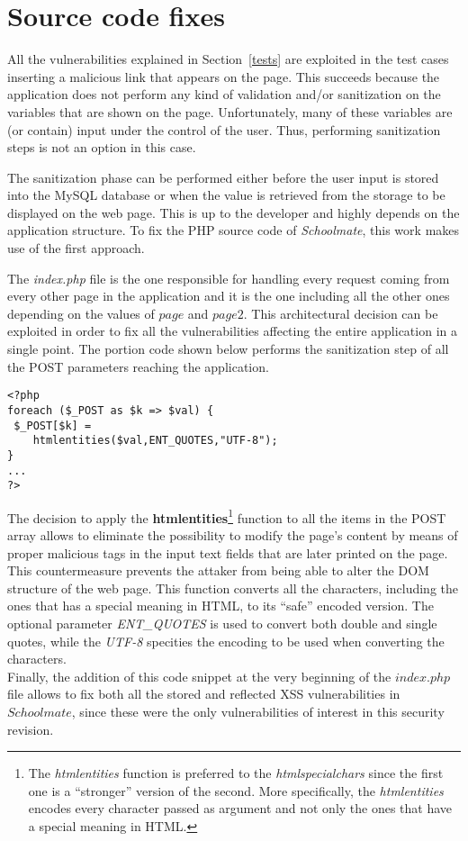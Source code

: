 \documentclass{sig-alternate-05-2015}
\begin{document}
\section{Source code fixes}\label{fixes}
All the vulnerabilities explained in Section~\ref{tests} are exploited in the test cases
inserting a malicious link that appears on the page. This succeeds because
the application does not perform any kind of validation and/or sanitization on the variables
that are shown on the page. Unfortunately, many of these variables are (or contain) input
under the control of the user. Thus, performing sanitization steps is not an option in this
case.

The sanitization phase can be performed either before the user input is stored into the
MySQL database or when the value is retrieved from the storage to be displayed on the
web page. This is up to the developer and highly depends on the application structure.
To fix the PHP source code of \emph{Schoolmate}, this work makes use of the first approach.

The \emph{index.php} file is the one responsible for handling every request coming from
every other page in the application and it is the one including all the other ones depending
on the values of $page$ and $page2$.
This architectural decision can be exploited in order
to fix all the vulnerabilities affecting the entire application in a single point.
The portion code shown below performs the sanitization step
of all the POST parameters reaching the application.

\begin{lstlisting}[frame=single, caption={Fixing all the vulnerabilities in index.php}]
<?php
foreach ($_POST as $k => $val) {
 $_POST[$k] =
    htmlentities($val,ENT_QUOTES,"UTF-8");
}
...
?>
\end{lstlisting}

The decision to apply the \textbf{htmlentities}\footnote{The \emph{htmlentities} function is preferred
to the \emph{htmlspecialchars} since the first one is a ``stronger'' version of the second. More specifically,
the \emph{htmlentities} encodes every character passed as argument and not only the ones that have a special
meaning in HTML.} function to all the items in the POST array allows
to eliminate the possibility to modify the page's content by means of proper malicious tags in the input
text fields that are later printed on the page. This countermeasure prevents the attaker from being able to
alter the DOM structure of the web page. This function converts all the characters, including the ones
that has a special meaning in HTML, to its ``safe'' encoded version. The optional parameter
\emph{ENT\_QUOTES} is used to convert both double and single quotes, while the \emph{UTF-8}
specities the encoding to be used when converting the characters.\\
Finally, the addition of this code snippet at the very beginning of the $index.php$ file allows to
fix both all the stored and reflected XSS vulnerabilities in $Schoolmate$, since these were the
only vulnerabilities of interest in this security revision.
\end{document}
